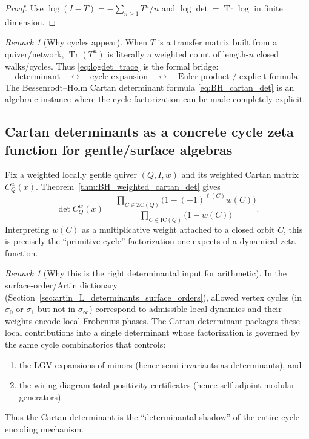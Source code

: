 \documentclass[11pt,oneside]{amsbook}
\numberwithin{equation}{section}
\theoremstyle{plain}
\theoremstyle{definition}
\theoremstyle{remark}
\newtheorem{remark}[theorem]{Remark}
\DeclareMathOperator{\Tr}{\mathrm{Tr}}
\begin{document}
\begin{proof}
Use $\log(I-T)=-\sum_{n\ge 1}T^n/n$ and $\log\det=\Tr\log$ in finite dimension.
\end{proof}

\begin{remark}[Why cycles appear]
When $T$ is a transfer matrix built from a quiver/network, $\Tr(T^n)$ is literally a weighted count of length-$n$ closed walks/cycles.
Thus \eqref{eq:logdet_trace} is the formal bridge:
\[
\text{determinant}\quad\longleftrightarrow\quad\text{cycle expansion}\quad\longleftrightarrow\quad\text{Euler product / explicit formula}.
\]
The Bessenrodt--Holm Cartan determinant formula \eqref{eq:BH_cartan_det} is an algebraic instance where the cycle-factorization can be made completely explicit.
\end{remark}

\subsection{Cartan determinants as a concrete cycle zeta function for gentle/surface algebras}
\label{sec:cartan_det_as_zeta}

Fix a weighted locally gentle quiver $(Q,I,w)$ and its weighted Cartan matrix $C_Q^w(x)$.
Theorem~\ref{thm:BH_weighted_cartan_det} gives
\[
\det C_Q^w(x)=
\frac{\prod_{C\in\mathrm{ZC}(Q)}\bigl(1-(-1)^{\ell(C)}w(C)\bigr)}
{\prod_{C\in\mathrm{IC}(Q)}\bigl(1-w(C)\bigr)}.
\]
Interpreting $w(C)$ as a multiplicative weight attached to a closed orbit $C$,
this is precisely the ``primitive-cycle'' factorization one expects of a dynamical zeta function.

\begin{remark}[Why this is the right determinantal input for arithmetic]
In the surface-order/Artin dictionary (Section~\ref{sec:artin_L_determinants_surface_orders}),
allowed vertex cycles (in $\sigma_0$ or $\sigma_1$ but not in $\sigma_\infty$) correspond to admissible local dynamics and their weights encode local Frobenius phases.
The Cartan determinant packages these local contributions into a single determinant whose factorization is governed by the same cycle combinatorics that controls:
\begin{enumerate}[label=(\roman*)]
\item the LGV expansions of minors (hence semi-invariants as determinants), and
\item the wiring-diagram total-positivity certificates (hence self-adjoint modular generators).
\end{enumerate}
Thus the Cartan determinant is the ``determinantal shadow'' of the entire cycle-encoding mechanism.
\end{remark}
\end{document}
